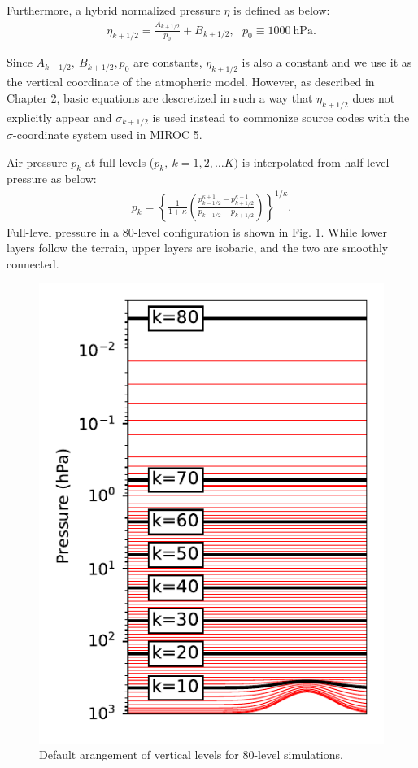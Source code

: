 Furthermore, a hybrid normalized pressure \(\eta\) is defined as below:
\begin{eqnarray}
\eta_{k+1/2} = \frac{A_{k+1/2}}{p_0} +B_{k+1/2},\ \ \ p_0\equiv 1000\ \mathrm{hPa}.
\end{eqnarray}

Since \(A_{k+1/2},\ B_{k+1/2}, p_0\) are constants, \(\eta_{k+1/2}\) is
also a constant and we use it as the vertical coordinate of the
atmopheric model.
However, as described in Chapter 2, basic equations
are descretized in such a way that \(\eta_{k+1/2}\) does not explicitly
appear and \(\sigma_{k+1/2}\) is used instead to commonize source codes
with the \(\sigma\)-coordinate system used in MIROC 5.

Air pressure \(p_k\) at full levels (\(p_k,\ k=1,2,\ldots K)\) is
interpolated from half-level pressure as below:
\begin{eqnarray}
 p_k = \left\{ \frac{1}{1+\kappa}
                     \left( \frac{  p^{\kappa +1}_{k-1/2}
                                  - p^{\kappa +1}_{k+1/2}      }
                                  { p_{k-1/2} - p_{k+1/2} }
                     \right)
              \right\}^{1/\kappa}.
\end{eqnarray}
Full-level pressure in a 80-level configuration is shown in Fig.
\ref{levels}. While lower layers follow the terrain, upper layers are
isobaric, and the two are smoothly connected.

\begin{figure}
\centering
\includegraphics{levels.pdf}
\caption{Default arangement of vertical levels for 80-level
simulations.\label{levels}}
\end{figure}

